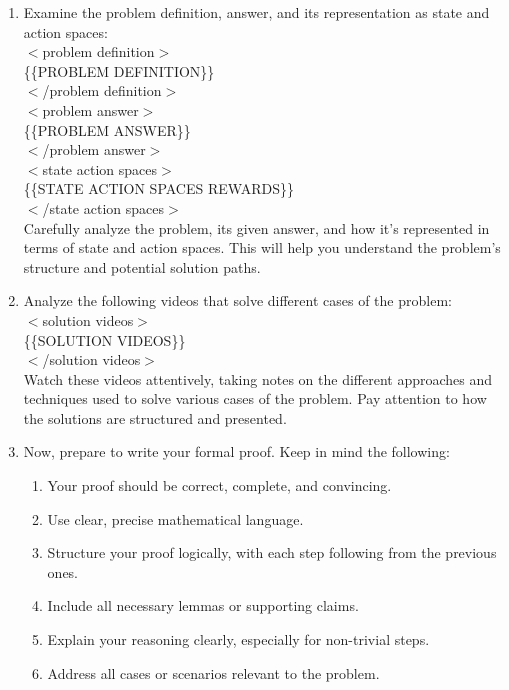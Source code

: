 {\begin{tcolorbox}
\begin{enumerate}
Pay close attention to the techniques and approaches outlined in these notes. They will be particularly relevant to the problem you're about to decode.\\

\item Examine the problem definition, answer, and its representation as state and action spaces: \\
$<$problem definition$>$ \\
\{\{PROBLEM DEFINITION\}\} \\
$<$/problem definition$>$ \\

$<$problem answer$>$ \\
\{\{PROBLEM ANSWER\}\} \\
$<$/problem answer$>$ \\

$<$state action spaces$>$ \\
\{\{STATE ACTION SPACES REWARDS\}\} \\
$<$/state action spaces$>$ \\

Carefully analyze the problem, its given answer, and how it's represented in terms of state and action spaces. This will help you understand the problem's structure and potential solution paths.\\

\item Analyze the following videos that solve different cases of the problem: \\
$<$solution videos$>$ \\
\{\{SOLUTION VIDEOS\}\} \\
$<$/solution videos$>$ \\

Watch these videos attentively, taking notes on the different approaches and techniques used to solve various cases of the problem. Pay attention to how the solutions are structured and presented.\\

\item Now, prepare to write your formal proof. Keep in mind the following:
\begin{enumerate}
   \item Your proof should be correct, complete, and convincing.
   \item Use clear, precise mathematical language.
   \item Structure your proof logically, with each step following from the previous ones.
   \item Include all necessary lemmas or supporting claims.
   \item Explain your reasoning clearly, especially for non-trivial steps.
   \item Address all cases or scenarios relevant to the problem.
\end{enumerate} 


\end{enumerate}
\end{tcolorbox}}
